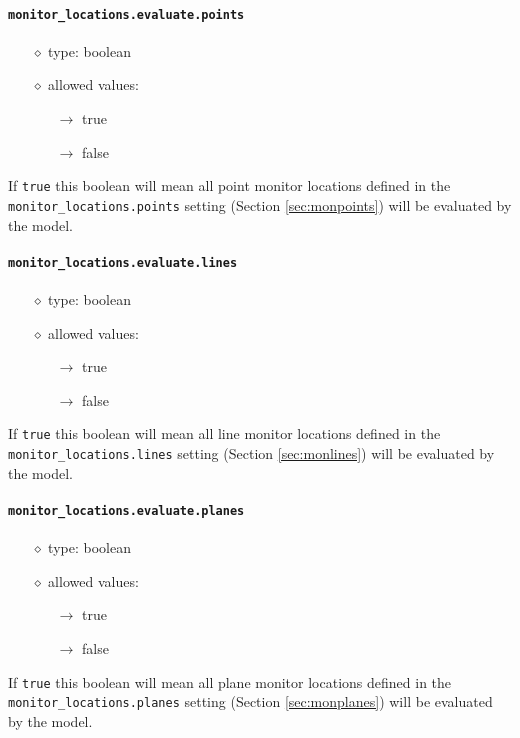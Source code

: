 \documentclass[]{article}
\def\code#1{\texttt{#1}}
\begin{document}
\paragraph{\code{monitor\_locations.evaluate.points}}
\begin{itemize}
    \item[$\diamond$] type: boolean
    \item[$\diamond$] allowed values:
    \begin{itemize}
        \item[$\rightarrow$] true
        \item[$\rightarrow$] false
    \end{itemize}
\end{itemize}
If \code{true} this boolean will mean all point monitor locations defined in the
\code{monitor\_locations.points} setting (Section \ref{sec:monpoints}) will be
evaluated by the model.

\paragraph{\code{monitor\_locations.evaluate.lines}}
\begin{itemize}
    \item[$\diamond$] type: boolean
    \item[$\diamond$] allowed values:
    \begin{itemize}
        \item[$\rightarrow$] true
        \item[$\rightarrow$] false
    \end{itemize}
\end{itemize}
If \code{true} this boolean will mean all line monitor locations defined in the
\code{monitor\_locations.lines} setting (Section \ref{sec:monlines}) will be
evaluated by the model.

\paragraph{\code{monitor\_locations.evaluate.planes}}
\begin{itemize}
    \item[$\diamond$] type: boolean
    \item[$\diamond$] allowed values:
    \begin{itemize}
        \item[$\rightarrow$] true
        \item[$\rightarrow$] false
    \end{itemize}
\end{itemize}
If \code{true} this boolean will mean all plane monitor locations defined in the
\code{monitor\_locations.planes} setting (Section \ref{sec:monplanes}) will be
evaluated by the model.
\end{document}
